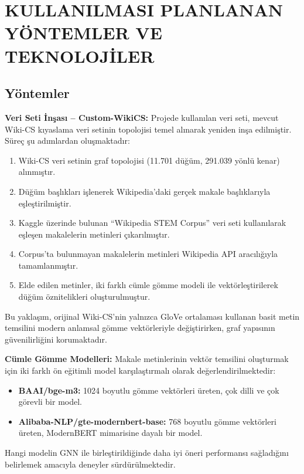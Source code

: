 \chapter{KULLANILMASI PLANLANAN YÖNTEMLER VE TEKNOLOJİLER}
\thispagestyle{empty}

\section{Yöntemler}

\textbf{Veri Seti İnşası -- Custom-WikiCS:}
Projede kullanılan veri seti, mevcut Wiki-CS \cite{mernyei2020wikics} kıyaslama veri setinin topolojisi temel alınarak yeniden inşa edilmiştir. Süreç şu adımlardan oluşmaktadır:
\begin{enumerate}
    \item Wiki-CS veri setinin graf topolojisi (11.701 düğüm, 291.039 yönlü kenar) alınmıştır.
    \item Düğüm başlıkları işlenerek Wikipedia'daki gerçek makale başlıklarıyla eşleştirilmiştir.
    \item Kaggle üzerinde bulunan ``Wikipedia STEM Corpus'' veri seti kullanılarak eşleşen makalelerin metinleri çıkarılmıştır.
    \item Corpus'ta bulunmayan makalelerin metinleri Wikipedia API aracılığıyla tamamlanmıştır.
    \item Elde edilen metinler, iki farklı cümle gömme modeli ile vektörleştirilerek düğüm öznitelikleri oluşturulmuştur.
\end{enumerate}

Bu yaklaşım, orijinal Wiki-CS'nin yalnızca GloVe ortalaması kullanan basit metin temsilini modern anlamsal gömme vektörleriyle değiştirirken, graf yapısının güvenilirliğini korumaktadır.

\textbf{Cümle Gömme Modelleri:}
Makale metinlerinin vektör temsilini oluşturmak için iki farklı ön eğitimli model karşılaştırmalı olarak değerlendirilmektedir:
\begin{itemize}
    \item \textbf{BAAI/bge-m3:} 1024 boyutlu gömme vektörleri üreten, çok dilli ve çok görevli bir model.
    \item \textbf{Alibaba-NLP/gte-modernbert-base:} 768 boyutlu gömme vektörleri üreten, ModernBERT mimarisine dayalı bir model.
\end{itemize}
Hangi modelin GNN ile birleştirildiğinde daha iyi öneri performansı sağladığını belirlemek amacıyla deneyler sürdürülmektedir.


